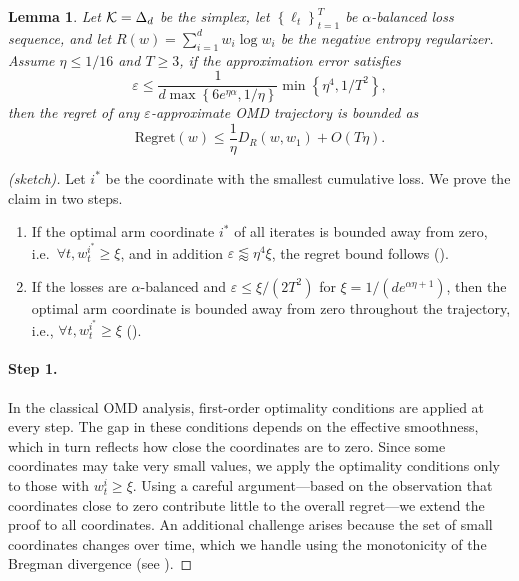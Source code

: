 \documentclass[10pt]{article}
\newtheorem{lemma}[theorem]{Lemma}
\theoremstyle{definition}
\theoremstyle{remark}
\newenvironment{proofsketch}[1][\proofname]{%
  \begin{proof}[#1 (sketch)]%
}{%
  \end{proof}%
}
\renewcommand{\epsilon}{\varepsilon}
\newcommand{\curly}[1]{ {\left\{ #1 \right\}}}
\begin{document}
\begin{lemma}\label{lem:balance upper bound}
Let $\mathcal K=\Delta_d$ be the simplex, let $\curly{\ell_t}_{t=1}^T$ be $\alpha$-balanced loss sequence, and let $R(w)=\sum_{i=1}^d w_i\log w_i$ be the negative entropy regularizer. Assume $\eta \le 1/16$ and $T\ge 3$,
if the approximation error satisfies 
\[
    \epsilon \le \frac{1}{d \max\curly{6e^{\eta \alpha}, 1/\eta}}\min\curly{\eta^4,1/T^2},
\]
then the regret of any $\epsilon$-approximate OMD trajectory is bounded as
\[
    \mathrm{Regret}(w) \le \frac{1}{\eta} D_R(w, w_1) + O(T \eta).
\]
\end{lemma}
\begin{proofsketch}
Let $i^*$ be the coordinate with the smallest cumulative loss. We prove the claim in two steps. 
\begin{enumerate}
    \item If the optimal arm coordinate $i^*$ of all iterates is bounded away from zero, i.e.\ $\forall t, w_t^{i^*} \ge \xi$, and in addition $\epsilon \lessapprox \eta^4\xi$, the regret bound follows ().
    \item If the losses are $\alpha$-balanced and $\epsilon \le \xi/(2T^2)$ for $\xi = 1/(d e^{\alpha\eta+1})$, then the optimal arm coordinate is bounded away from zero throughout the trajectory, i.e., $\forall t, w_t^{i^*} \ge \xi$ ().
\end{enumerate}

\paragraph{Step 1.} 
In the classical OMD analysis, first-order optimality conditions are applied at every step. The gap in these conditions depends on the effective smoothness, which in turn reflects how close the coordinates are to zero. Since some coordinates may take very small values, we apply the optimality conditions only to those with $w_t^i \ge \xi$. Using a careful argument—based on the observation that coordinates close to zero contribute little to the overall regret—we extend the proof to all coordinates. An additional challenge arises because the set of small coordinates changes over time, which we handle using the monotonicity of the Bregman divergence (see ).


\end{proofsketch}
\end{document}
